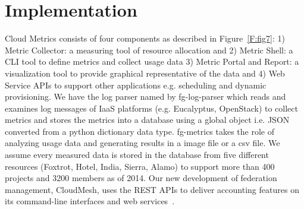 \documentclass{sig-alternate-05-2015}
\begin{document}
\section{Implementation} \label{S:implementation}




Cloud Metrics consists of four components as described in Figure~\ref{F:fig7}: 1) Metric Collector: a measuring tool of resource allocation and 2) Metric Shell: a CLI tool to define metrics and collect usage data 3) Metric Portal and Report: a visualization tool to provide graphical representative of the data and 4) Web Service APIs to support other applications e.g. scheduling and dynamic provisioning. We have the log parser named by fg-log-parser which reads and examines log messages of IaaS platforms (e.g. Eucalyptus, OpenStack) to collect metrics and stores the metrics into a database using a global object i.e. JSON converted from a python dictionary data type. fg-metrics takes the role of analyzing usage data and generating results in a image file or a csv file. We assume every measured data is stored in the database from five different resources (Foxtrot, Hotel, India, Sierra, Alamo) to support more than 400 projects and 3200 members as of 2014. Our new development of federation management, CloudMesh, uses the REST APIs to deliver accounting features on its command-line interfaces and web services~\cite{las14cloudmeshmultiple}.
\end{document}
